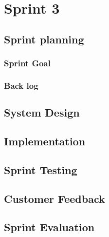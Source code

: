 \chapter{Sprint 3}


\section{Sprint planning}

\subsection{Sprint Goal}

\subsection{Back log}


\section{System Design}


\section{Implementation}


\section{Sprint Testing}


\section{Customer Feedback}


\section{Sprint Evaluation}


